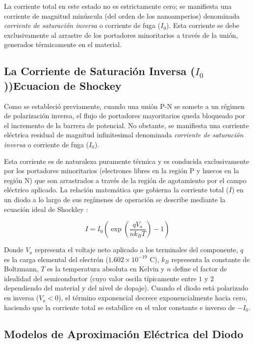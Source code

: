 La corriente total en este estado no es estrictamente cero; se manifiesta una corriente de magnitud minúscula (del orden de los nanoamperios) denominada \textit{corriente de saturación inversa} o corriente de fuga ($I_0$). Esta corriente se debe exclusivamente al arrastre de los portadores minoritarios a través de la unión, generados térmicamente en el material.

\subsection{La Corriente de Saturación Inversa ($I_0$))Ecuacion de Shockey}
Como se estableció previamente, cuando una unión P-N se somete a un régimen de polarización inversa, el flujo de portadores mayoritarios queda bloqueado por el incremento de la barrera de potencial. No obstante, se manifiesta una corriente eléctrica residual de magnitud infinitesimal denominada \textit{corriente de saturación inversa} o corriente de fuga ($I_0$).

Esta corriente es de naturaleza puramente térmica y es conducida exclusivamente por los portadores minoritarios (electrones libres en la región P y huecos en la región N) que son arrastrados a través de la región de agotamiento por el campo eléctrico aplicado. La relación matemática que gobierna la corriente total ($I$) en un diodo a lo largo de sus regímenes de operación se describe mediante la ecuación ideal de Shockley \cite{REF_3,REF_4}:

\begin{equation}
I = I_0 \left( \exp\left(\frac{q V_a}{n k_B T}\right) - 1 \right)
\end{equation}

Donde $V_a$ representa el voltaje neto aplicado a los terminales del componente, $q$ es la carga elemental del electrón ($1.602 \times 10^{-19}\text{ C}$), $k_B$ representa la constante de Boltzmann, $T$ es la temperatura absoluta en Kelvin y $n$ define el factor de idealidad del semiconductor (cuyo valor oscila típicamente entre $1$ y $2$ dependiendo del material y del nivel de dopaje). Cuando el diodo está polarizado en inversa ($V_a < 0$), el término exponencial decrece exponencialmente hacia cero, haciendo que la corriente total se estabilice en el valor constante e inverso de $-I_0$.

\subsection{Modelos de Aproximación Eléctrica del Diodo}

